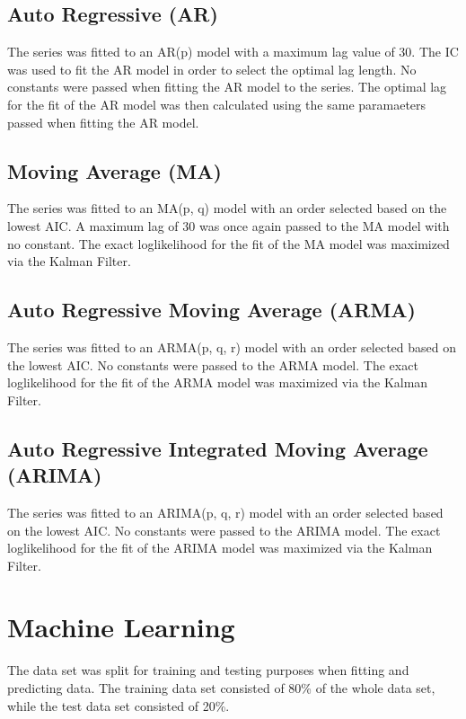 \subsection{Auto Regressive (AR)}
The series was fitted to an AR(p) model with a maximum lag value of 30. The IC was used to fit the AR model in order to select the optimal lag length. No constants were passed when fitting the AR model to the series. The optimal lag for the fit of the AR model was then calculated using the same paramaeters passed when fitting the AR model.

\subsection{Moving Average (MA)}
The series was fitted to an MA(p, q) model with an order selected based on the lowest AIC. A maximum lag of 30 was once again passed to the MA model with no constant. The exact loglikelihood for the fit of the MA model was maximized via the Kalman Filter.

\subsection{Auto Regressive Moving Average (ARMA)}
The series was fitted to an ARMA(p, q, r) model with an order selected based on the lowest AIC. No constants were passed to the ARMA model. The exact loglikelihood for the fit of the ARMA model was maximized via the Kalman Filter.

\subsection{Auto Regressive Integrated Moving Average (ARIMA)}
The series was fitted to an ARIMA(p, q, r) model with an order selected based on the lowest AIC. No constants were passed to the ARIMA model. The exact loglikelihood for the fit of the ARIMA model was maximized via the Kalman Filter.

\section{Machine Learning}
The data set was split for training and testing purposes when fitting and predicting data. The training data set consisted of 80\% of the whole data set, while the test data set consisted of 20\%.

